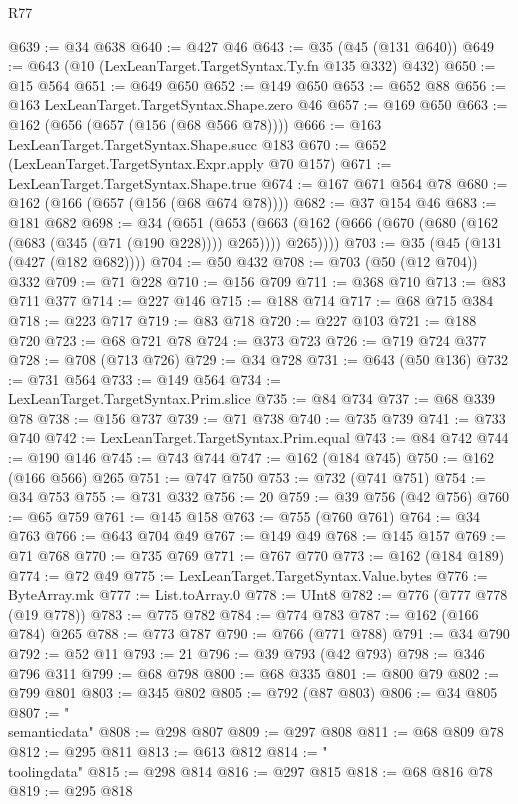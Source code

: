 \begin{lexlean}{R77}
\begin{coremodule}
{{@639 := @34 @638
@640 := @427 @46
@643 := @35 (@45 (@131 @640))
@649 := @643 (@10 (LexLeanTarget.TargetSyntax.Ty.fn @135 @332) @432)
@650 := @15 @564
@651 := @649 @650
@652 := @149 @650
@653 := @652 @88
@656 := @163 LexLeanTarget.TargetSyntax.Shape.zero @46
@657 := @169 @650
@663 := @162 (@656 (@657 (@156 (@68 @566 @78))))
@666 := @163 LexLeanTarget.TargetSyntax.Shape.succ @183
@670 := @652 (LexLeanTarget.TargetSyntax.Expr.apply @70 @157)
@671 := LexLeanTarget.TargetSyntax.Shape.true
@674 := @167 @671 @564 @78
@680 := @162 (@166 (@657 (@156 (@68 @674 @78))))
@682 := @37 @154 @46
@683 := @181 @682
@698 := @34
    (@651
      (@653 (@663 (@162 (@666 (@670 (@680 (@162 (@683 (@345 (@71 (@190 @228)))) @265)))) @265))))
@703 := @35 (@45 (@131 (@427 (@182 @682))))
@704 := @50 @432
@708 := @703 (@50 (@12 @704)) @332
@709 := @71 @228
@710 := @156 @709
@711 := @368 @710
@713 := @83 @711 @377
@714 := @227 @146
@715 := @188 @714
@717 := @68 @715 @384
@718 := @223 @717
@719 := @83 @718
@720 := @227 @103
@721 := @188 @720
@723 := @68 @721 @78
@724 := @373 @723
@726 := @719 @724 @377
@728 := @708 (@713 @726)
@729 := @34 @728
@731 := @643 (@50 @136)
@732 := @731 @564
@733 := @149 @564
@734 := LexLeanTarget.TargetSyntax.Prim.slice
@735 := @84 @734
@737 := @68 @339 @78
@738 := @156 @737
@739 := @71 @738
@740 := @735 @739
@741 := @733 @740
@742 := LexLeanTarget.TargetSyntax.Prim.equal
@743 := @84 @742
@744 := @190 @146
@745 := @743 @744
@747 := @162 (@184 @745)
@750 := @162 (@166 @566) @265
@751 := @747 @750
@753 := @732 (@741 @751)
@754 := @34 @753
@755 := @731 @332
@756 := 20
@759 := @39 @756 (@42 @756)
@760 := @65 @759
@761 := @145 @158
@763 := @755 (@760 @761)
@764 := @34 @763
@766 := @643 @704 @49
@767 := @149 @49
@768 := @145 @157
@769 := @71 @768
@770 := @735 @769
@771 := @767 @770
@773 := @162 (@184 @189)
@774 := @72 @49
@775 := LexLeanTarget.TargetSyntax.Value.bytes
@776 := ByteArray.mk
@777 := List.toArray.{0}
@778 := UInt8
@782 := @776 (@777 @778 (@19 @778))
@783 := @775 @782
@784 := @774 @783
@787 := @162 (@166 @784) @265
@788 := @773 @787
@790 := @766 (@771 @788)
@791 := @34 @790
@792 := @52 @11
@793 := 21
@796 := @39 @793 (@42 @793)
@798 := @346 @796 @311
@799 := @68 @798
@800 := @68 @335
@801 := @800 @79
@802 := @799 @801
@803 := @345 @802
@805 := @792 (@87 @803)
@806 := @34 @805
@807 := "\\semanticdata"
@808 := @298 @807
@809 := @297 @808
@811 := @68 @809 @78
@812 := @295 @811
@813 := @613 @812
@814 := "\\toolingdata"
@815 := @298 @814
@816 := @297 @815
@818 := @68 @816 @78
@819 := @295 @818
}}
\end{coremodule}
\end{lexlean}
